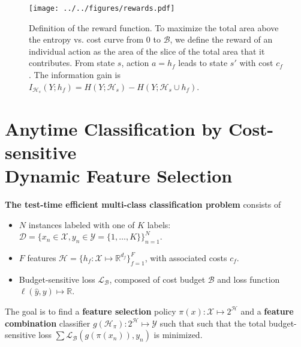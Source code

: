 
\begin{figure}[t]
\texttt{[image: ../../figures/rewards.pdf]}
\caption{
Definition of the reward function.
To maximize the total area above the entropy vs. cost curve from $0$ to $\mathcal{B}$, we define the reward of an individual action as the area of the slice of the total area that it contributes.
From state $s$, action $a = h_f$ leads to state $s'$ with cost $c_f$.
The information gain is $I_{\mathcal{H}_s}(Y; h_f) = H(Y; \mathcal{H}_s) - H(Y; \mathcal{H}_s \cup {h_f})$.
\label{fig:rewards}}
\end{figure}

\section{Anytime Classification by Cost-sensitive\\Dynamic Feature Selection}

\begin{mydef} \label{def:problem}
\textbf{The test-time efficient multi-class classification problem} consists of

\begin{itemize}
\addtolength{\itemsep}{-.55\baselineskip}
\item
$N$ instances labeled with one of $K$ labels: ${\mathcal{D} = \{x_n \in \mathcal{X}, y_n \in \mathcal{Y} = \{1, \dots, K\}\}_{n=1}^N}$.

\item
$F$ features $\mathcal{H} = \{h_f : \mathcal{X} \mapsto \mathbb{R}^{d_f} \}_{f=1}^F$, with associated costs $c_f$.

\item Budget-sensitive loss $\mathcal{L}_\mathcal{B}$, composed of cost budget $\mathcal{B}$ and loss function ${\ell(\hat{y}, y) \mapsto \mathbb{R}}$.
\end{itemize}

The goal is to find a \textbf{feature selection} policy $\pi(x): \mathcal{X} \mapsto 2^\mathcal{H}$ and a \textbf{feature combination} classifier $g(\mathcal{H}_\pi) : 2^\mathcal{H} \mapsto \mathcal{Y}$ such that such that the total budget-sensitive loss $\sum \mathcal{L}_\mathcal{B}(g(\pi(x_n)), y_n)$ is minimized.
\end{mydef}


